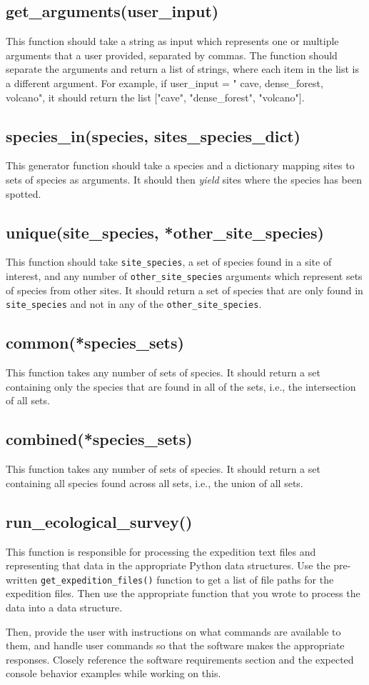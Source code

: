 \documentclass[12pt,letterpaper]{article}
\begin{document}
\subsection{get\_arguments(user\_input)}
This function should take a string as input which represents one or multiple arguments that a user provided, separated by commas. The function should separate the arguments and return a list of strings, where each item in the list is a different argument. For example, if user\_input = " cave, dense\_forest, volcano", it should return the list ["cave", "dense\_forest", "volcano"].

\subsection{species\_in(species, sites\_species\_dict)}
This generator function should take a species and a dictionary mapping sites to sets of species as arguments. It should then \emph{yield} sites where the species has been spotted.

\subsection{unique(site\_species, *other\_site\_species)}
This function should take \texttt{site\_species}, a set of species found in a site of interest, and any number of \texttt{other\_site\_species} arguments which represent sets of species from other sites. It should return a set of species that are only found in \texttt{site\_species} and not in any of the \texttt{other\_site\_species}.

\subsection{common(*species\_sets)}
This function takes any number of sets of species. It should return a set containing only the species that are found in all of the sets, i.e., the intersection of all sets.

\subsection{combined(*species\_sets)}
This function takes any number of sets of species. It should return a set containing all species found across all sets, i.e., the union of all sets.

\subsection{run\_ecological\_survey()}
This function is responsible for processing the expedition text files and representing that data in the appropriate Python data structures. Use the pre-written \texttt{get\_expedition\_files()} function to get a list of file paths for the expedition files. Then use the appropriate function that you wrote to process the data into a data structure.

Then, provide the user with instructions on what commands are available to them, and handle user commands so that the software makes the appropriate responses. Closely reference the software requirements section and the expected console behavior examples while working on this.
\end{document}
